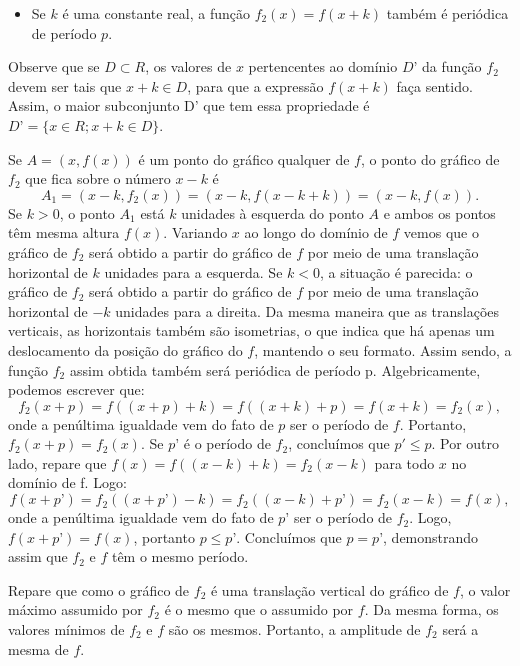 \begin{itemize}
\item 	Se $k$ é uma constante real, a função $f_2(x) = f(x + k)$ também é periódica de período $p$.
\end{itemize}
Observe que se $D\subset R$, os valores de $x$ pertencentes ao domínio $D’$ da função $f_2$ devem ser tais que $x + k \in D$, para que a expressão $f(x+k)$ faça sentido. Assim, o maior subconjunto D’ que tem essa propriedade é $D’ = \{x \in R;x+k\in D\}$.

Se $A = (x,f(x))$ é um ponto do gráfico qualquer de $f$, o ponto do gráfico de $f_2$ que fica sobre o número $x - k$  é 
\begin{equation*}
A_1 = (x - k , f_2(x)) = (x - k, f(x - k + k)) = (x - k, f(x)).
\end{equation*}
Se $k > 0$, o ponto $A_1$ está $k$ unidades à esquerda do ponto $A$ e ambos os pontos têm mesma altura $f(x)$. Variando $x$ ao longo do domínio de $f$ vemos que o gráfico de $f_2$ será obtido a partir do gráfico de $f$ por meio de uma translação horizontal de $k$ unidades para a esquerda. Se $k < 0$, a situação é parecida: o gráfico de $f_2$ será obtido a partir do gráfico de $f$ por meio de uma translação horizontal de $-k$ unidades para a direita. Da mesma maneira que as translações verticais, as horizontais também são isometrias, o que indica que há apenas um deslocamento da posição do gráfico do $f$, mantendo o seu formato. Assim sendo, a função $f_2$ assim obtida também será periódica de período p. Algebricamente, podemos escrever que:
\begin{equation*}
f_2(x+p) = f((x+p) + k) = f((x+k)+p) = f(x+k) = f_2(x),
\end{equation*}
onde a penúltima igualdade vem do fato de $p$ ser o período de $f$. Portanto, $f_2(x+p) = f_2(x)$. Se $p’$ é o período de $f_2$, concluímos que $p'\leq p$. Por outro lado, repare que $f(x) = f((x - k ) + k) = f_2(x - k)$ para todo $x$ no domínio de f. Logo:
\begin{equation*}
f(x +p’) = f_2((x+p’) - k) = f_2((x - k) + p’) = f_2(x - k) = f(x),
\end{equation*}
onde a penúltima igualdade vem do fato de $p’$ ser o período de $f_2$. Logo, $f(x+p’) = f(x)$, portanto $p\leq p’$. Concluímos que $p = p’$, demonstrando assim que $f_2$ e $f$ têm o mesmo período.

Repare que como o gráfico de $f_2$ é uma translação vertical do gráfico de $f$, o valor máximo assumido por $f_2$ é o mesmo que o assumido por $f$. Da mesma forma, os valores mínimos de $f_2$ e $f$ são os mesmos. Portanto, a amplitude de $f_2$ será a mesma de $f$.

